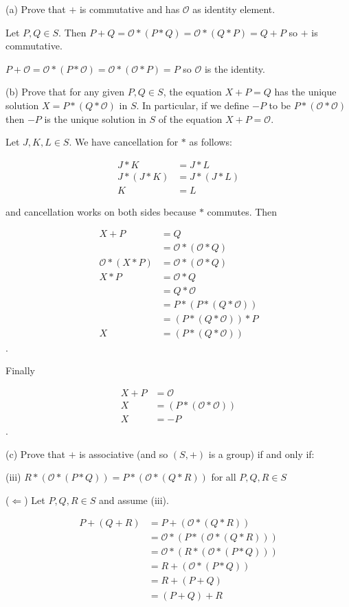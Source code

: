 \documentclass{article}
\begin{document}
(a) Prove that $+$ is commutative and has $\mathcal{O}$ as identity element.

Let $P,Q \in S$. Then $P+Q = \mathcal{O} * (P * Q) = \mathcal{O} * (Q * P) = Q+P$ so $+$ is commutative.

$P + \mathcal{O} = \mathcal{O} * (P * \mathcal{O}) = \mathcal{O} * (\mathcal{O} * P) = P$ so $\mathcal{O}$ is the identity.

(b) Prove that for any given $P,Q \in S$, the equation $X+P = Q$ has the unique solution $X = P*(Q*\mathcal{O})$ in $S$. In particular, if we define $-P$ to be $P*(\mathcal{O} * \mathcal{O})$ then $-P$ is the unique solution in $S$ of the equation $X+P = \mathcal{O}$.

Let $J, K, L \in S$. We have cancellation for $*$ as follows:

\begin{align*}
J * K &= J * L\\
J * (J * K) &= J * (J * L)\\
K &= L
\end{align*}

and cancellation works on both sides because $*$ commutes. Then

\begin{align*}
X+P & = Q \\
& = \mathcal{O} * (\mathcal{O} * Q) \\
\mathcal{O} * (X * P) &= \mathcal{O} * (\mathcal{O} * Q) \\
X * P &= \mathcal{O} * Q \\
&= Q * \mathcal{O} \\
&= P * (P * (Q * \mathcal{O})) \\
&= (P * (Q * \mathcal{O})) * P \\
X &= (P * (Q * \mathcal{O}))
\end{align*}.

Finally

\begin{align*}
X+P &= \mathcal{O}\\
X &= (P * (\mathcal{O} * \mathcal{O}))\\
X &= -P
\end{align*}.

(c) Prove that $+$ is associative (and so $(S,+)$ is a group) if and only if:

(iii) $R*(\mathcal{O}*(P*Q)) = P*(\mathcal{O}*(Q*R))$ for all $P,Q,R \in S$

($\Leftarrow$) Let $P,Q,R \in S$ and assume (iii).

\begin{align*}
P + (Q + R) &= P + (\mathcal{O} * (Q * R)) \\
&= \mathcal{O} * (P * (\mathcal{O} * (Q * R))) \\
&= \mathcal{O} * (R * (\mathcal{O} * (P * Q))) \\
&= R + (\mathcal{O} * (P * Q)) \\
&= R + (P + Q) \\
&= (P + Q) + R
\end{align*}
\end{document}
